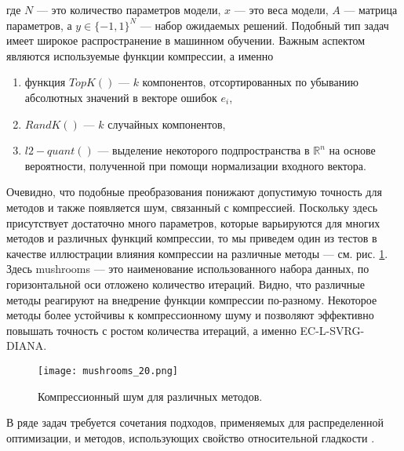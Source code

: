   где $N$ --- это количество параметров модели, $x$ --- это веса модели, $A$ --- матрица параметров, а $y \in {\{-1,1\}}^N$ --- набор ожидаемых решений. Подобный тип задач имеет широкое распространение в машинном обучении. Важным аспектом являются используемые функции компрессии, а именно 
  \begin{enumerate}
    \item функция $TopK()$ --- $k$ компонентов, отсортированных по убыванию абсолютных значений в векторе ошибок $e_i$,
    \item $RandK()$ --- $k$ случайных компонентов,
    \item $l2-quant()$ --- выделение некоторого подпространства в $\mathbb{R}^n$ на основе вероятности, полученной при помощи нормализации входного вектора. 
  \end{enumerate}

  Очевидно, что подобные преобразования понижают допустимую точность для методов и также появляется шум, связанный с компрессией. Поскольку здесь присутствует достаточно много параметров, которые варьируются для многих методов и различных функций компрессии, то мы приведем один из тестов в качестве иллюстрации влияния компрессии на различные методы --- см. рис. \ref{compr}. Здесь mushrooms --- это наименование использованного набора данных, по горизонтальной оси отложено количество итераций. Видно, что различные методы реагируют на внедрение функции компрессии по-разному. Некоторое методы более устойчивы к компрессионному шуму и позволяют эффективно повышать точность с ростом количества итераций, а именно EC-L-SVRG-DIANA.
  \begin{figure}
    \begin{center}
      \texttt{[image: mushrooms\_20.png]}
    \end{center}
    \caption{Компрессионный шум для различных методов.}
    \label{compr}
  \end{figure}
  В ряде задач требуется сочетания подходов, применяемых для распределенной оптимизации, и методов, использующих свойство относительной гладкости \cite{distrib_relative}. 

